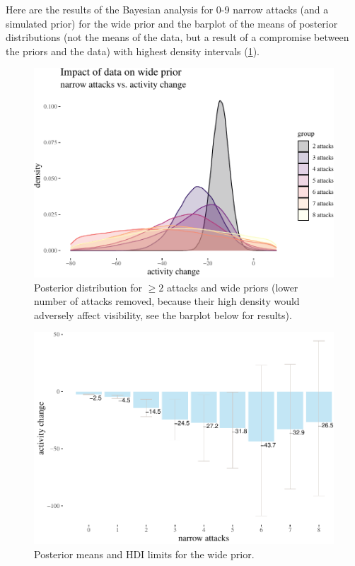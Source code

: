\documentclass[a4paper,fleqn]{cas-dc}
\begin{document}
Here are the results of the Bayesian analysis for 0-9 narrow attacks
(and a simulated prior) for the wide prior and the barplot of the means
of posterior distributions (not the means of the data, but a result of a
compromise between the priors and the data) with highest density
intervals (\ref{fig:bayesian1}).

\begin{figure}

\begin{center}
\includegraphics[width=1\linewidth]{images/unnamed-chunk-24-1} \end{center}
\caption{Posterior distribution for $\geq 2$ attacks and wide priors (lower number of attacks removed, because their high density would adversely affect visibility, see the barplot below for results).}
\label{fig:bayesian1}

\end{figure}

\begin{figure}

\begin{center}
\includegraphics[width=1\linewidth]{images/unnamed-chunk-25-1} \end{center}
\caption{Posterior means and HDI limits for the wide prior.}
\end{figure}
\end{document}
